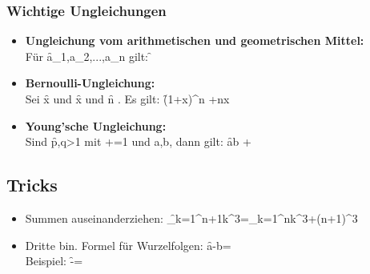 \subsubsection{Wichtige Ungleichungen}
\begin{itemize}
    \item \textbf{Ungleichung vom arithmetischen und geometrischen Mittel:}\\
    Für \f{a_1,a_2,...,a_n} gilt: \f{\geq {}}
    \item \textbf{Bernoulli-Ungleichung:}\\
    Sei \f{x \in {}} und \f{x } und \f{n \in {}}. Es gilt: \f{(1+x)^n  +nx}
    \item \textbf{Young'sche Ungleichung:}\\
    Sind \f{p,q>1 \textrm{ mit } +=1 \textrm{ und } a,b}, dann gilt: \f{ab \leq {}+}
\end{itemize}



\subsection{Tricks}
\begin{itemize}
    \item Summen auseinanderziehen: \f{\sum_{k=1}^{n+1}k^3=\sum_{k=1}^{n}k^3+(n+1)^3}
    \item Dritte bin. Formel für Wurzelfolgen: \f{a-b=}\\
    Beispiel: \f{-=}
\end{itemize}



